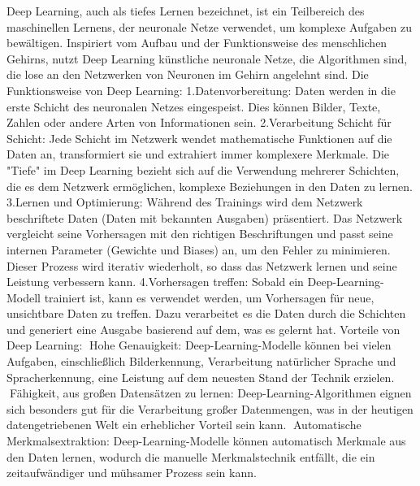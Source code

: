 Deep Learning, auch als tiefes Lernen bezeichnet, ist ein Teilbereich des maschinellen Lernens, der neuronale Netze verwendet, um komplexe Aufgaben zu bewältigen. Inspiriert vom Aufbau und der Funktionsweise des menschlichen Gehirns, nutzt Deep Learning künstliche neuronale Netze, die Algorithmen sind, die lose an den Netzwerken von Neuronen im Gehirn angelehnt sind.
Die Funktionsweise von Deep Learning:
1.Datenvorbereitung: Daten werden in die erste Schicht des neuronalen Netzes eingespeist. Dies können Bilder, Texte, Zahlen oder andere Arten von Informationen sein.
2.Verarbeitung Schicht für Schicht: Jede Schicht im Netzwerk wendet mathematische Funktionen auf die Daten an, transformiert sie und extrahiert immer komplexere Merkmale. Die "Tiefe" im Deep Learning bezieht sich auf die Verwendung mehrerer Schichten, die es dem Netzwerk ermöglichen, komplexe Beziehungen in den Daten zu lernen.
3.Lernen und Optimierung: Während des Trainings wird dem Netzwerk beschriftete Daten (Daten mit bekannten Ausgaben) präsentiert. Das Netzwerk vergleicht seine Vorhersagen mit den richtigen Beschriftungen und passt seine internen Parameter (Gewichte und Biases) an, um den Fehler zu minimieren. Dieser Prozess wird iterativ wiederholt, so dass das Netzwerk lernen und seine Leistung verbessern kann.
4.Vorhersagen treffen: Sobald ein Deep-Learning-Modell trainiert ist, kann es verwendet werden, um Vorhersagen für neue, unsichtbare Daten zu treffen. Dazu verarbeitet es die Daten durch die Schichten und generiert eine Ausgabe basierend auf dem, was es gelernt hat.
Vorteile von Deep Learning:
Hohe Genauigkeit: Deep-Learning-Modelle können bei vielen Aufgaben, einschließlich Bilderkennung, Verarbeitung natürlicher Sprache und Spracherkennung, eine Leistung auf dem neuesten Stand der Technik erzielen.
Fähigkeit, aus großen Datensätzen zu lernen: Deep-Learning-Algorithmen eignen sich besonders gut für die Verarbeitung großer Datenmengen, was in der heutigen datengetriebenen Welt ein erheblicher Vorteil sein kann.
Automatische Merkmalsextraktion: Deep-Learning-Modelle können automatisch Merkmale aus den Daten lernen, wodurch die manuelle Merkmalstechnik entfällt, die ein zeitaufwändiger und mühsamer Prozess sein kann.


